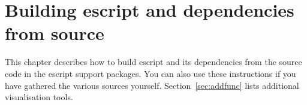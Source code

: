 %
%
%

\chapter{Building escript and dependencies from source}
\label{chap:allsrc}

This chapter describes how to build escript and its dependencies from the source code in the escript support packages.
You can also use these instructions if you have gathered the various sources yourself.
Section~\ref{sec:addfunc} lists additional visualisation tools.




